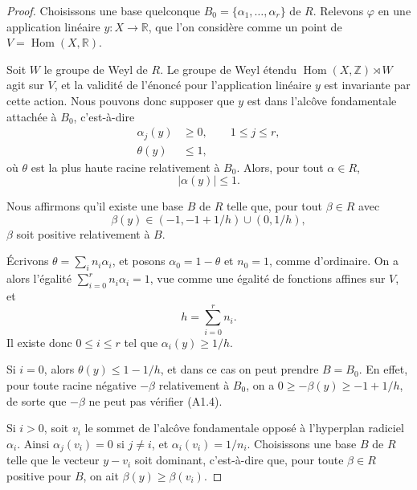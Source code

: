 \documentclass[11pt]{article}
\begin{document}
\begin{proof}
Choisissons une base quelconque \(B_0=\{\alpha_1,\ldots,\alpha_r\}\) de \(R\). Relevons
\(\varphi\) en une application linéaire \(y:X\to\mathbb R\), que l'on considère comme un point de
\(V=\operatorname{Hom}(X,\mathbb R)\).

Soit \(W\) le groupe de Weyl de \(R\). Le groupe de Weyl étendu
\(\operatorname{Hom}(X,\mathbb Z)\rtimes W\) agit sur \(V\), et la validité de l'énoncé pour
l'application linéaire \(y\) est invariante par cette action. Nous pouvons donc supposer que \(y\)
est dans l'alcôve fondamentale attachée à \(B_0\), c'est-à-dire
\begin{align}
  \alpha_j(y)&\ge 0,\qquad 1\le j\le r, \tag{A1.1}\\
  \theta(y)&\le 1, \tag{A1.2}
\end{align}
où \(\theta\) est la plus haute racine relativement à \(B_0\). Alors, pour tout \(\alpha\in R\),
\begin{equation}
  |\alpha(y)|\le 1.
  \tag{A1.3}
\end{equation}

Nous affirmons qu'il existe une base \(B\) de \(R\) telle que, pour tout \(\beta\in R\) avec
\begin{equation}
  \beta(y)\in (-1,-1+1/h)\cup(0,1/h),
  \tag{A1.4}
\end{equation}
\(\beta\) soit positive relativement à \(B\).

Écrivons \(\theta=\sum_i n_i\alpha_i\), et posons \(\alpha_0=1-\theta\) et \(n_0=1\), comme
d'ordinaire. On a alors l'égalité \(\sum_{i=0}^r n_i\alpha_i=1\), vue comme une égalité de fonctions
affines sur \(V\), et
\begin{equation}
  h=\sum_{i=0}^r n_i.
  \tag{A1.5}
\end{equation}
Il existe donc \(0\le i\le r\) tel que \(\alpha_i(y)\ge1/h\).

Si \(i=0\), alors \(\theta(y)\le1-1/h\), et dans ce cas on peut prendre \(B=B_0\). En effet, pour
toute racine négative \(-\beta\) relativement à \(B_0\), on a
\(0\ge -\beta(y)\ge -1+1/h\), de sorte que \(-\beta\) ne peut pas vérifier (A1.4).

Si \(i>0\), soit \(v_i\) le sommet de l'alcôve fondamentale opposé à l'hyperplan radiciel
\(\alpha_i\). Ainsi \(\alpha_j(v_i)=0\) si \(j\ne i\), et \(\alpha_i(v_i)=1/n_i\). Choisissons
une base \(B\) de \(R\) telle que le vecteur \(y-v_i\) soit dominant, c'est-à-dire que, pour toute
\(\beta\in R\) positive pour \(B\), on ait \(\beta(y)\ge\beta(v_i)\).


\end{proof}
\end{document}
